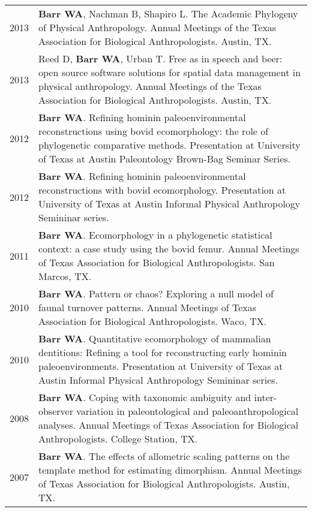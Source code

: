 \documentclass{article}
\begin{document}
\begin{longtable}{p{}p{}}
2013 & {\bfseries Barr WA}, Nachman B, Shapiro L. The Academic Phylogeny of Physical Anthropology. Annual Meetings of the Texas Association for Biological Anthropologists. Austin, TX.\\[4pt]

2013 & Reed D, {\bfseries Barr WA}, Urban T. Free as in speech and beer: open source software solutions for spatial data management in physical anthropology. Annual Meetings of the Texas Association for Biological Anthropologists. Austin, TX.\\[4pt]

2012 & {\bfseries Barr WA}. Refining hominin paleoenvironmental reconstructions using bovid ecomorphology: the role of phylogenetic comparative methods. Presentation at University of Texas at Austin Paleontology Brown-Bag Seminar Series.\\[4pt]

2012 & {\bfseries Barr WA}. Refining hominin paleoenvironmental reconstructions with bovid ecomorphology. Presentation at University of Texas at Austin Informal Physical Anthropology Semininar series.\\[4pt]

2011 & {\bfseries Barr WA}. Ecomorphology in a phylogenetic statistical context: a case study using the bovid femur. Annual Meetings of Texas Association for Biological Anthropologists. San Marcos, TX.\\[4pt]

2010 & {\bfseries Barr WA}. Pattern or chaos? Exploring a null model of faunal turnover patterns. Annual Meetings of Texas Association for Biological Anthropologists. Waco, TX.\\[4pt]

2010 & {\bfseries Barr WA}. Quantitative ecomorphology of mammalian dentitions: Refining a tool for reconstructing early hominin paleoenvironments. Presentation at University of Texas at Austin Informal Physical Anthropology Semininar series.\\[4pt]

2008 & {\bfseries Barr WA}. Coping with taxonomic ambiguity and inter-observer variation in paleontological and paleoanthropological analyses. Annual Meetings of Texas Association for Biological Anthropologists. College Station, TX.\\[4pt]

2007 & {\bfseries Barr WA}. The effects of allometric scaling patterns on the template method for estimating dimorphism. Annual Meetings of Texas Association for Biological Anthropologists. Austin, TX.\\
\end{longtable}
\end{document}
